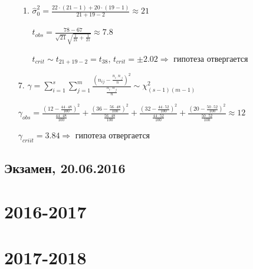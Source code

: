\documentclass[12pt, a4paper]{article}\usepackage[]{graphicx}\usepackage[]{color}
\begin{document}
\begin{enumerate}
\begin{enumerate}
			\item $\hat{\sigma}_0^2 = \frac{22\cdot (21-1) + 20 \cdot (19-1)}{21 + 19 - 2} \approx 21$

			$t_{obs} = \frac{78-67}{\sqrt{21} \sqrt{\frac{1}{21}+ \frac{1}{21}}} \approx 7.8 $

			$t_{crit}  \sim t_{21+19-2} = t_{38}$, $t_{crit} = \pm 2.02 \Rightarrow$ гипотеза отвергается
		\end{enumerate}

	\item[7.] $\gamma = \sum_{i=1}^s \sum_{j=1}^m \frac{\left(n_{ij} - \frac{n_{i\cdot}n_{\cdot j}}{n}\right)^2}{\frac{n_{i\cdot}n_{\cdot j}}{n}} \sim \chi^2_{(s-1)(m-1)}$

	$\gamma_{obs} = \frac{\left(12-\frac{44\cdot48}{100}\right)^2}{\frac{44\cdot48}{100}} + \frac{\left(36-\frac{56\cdot48}{100}\right)^2}{\frac{56\cdot48}{100}} + \frac{\left(32-\frac{44\cdot52}{100}\right)^2}{\frac{44\cdot52}{100}} + \frac{\left(20-\frac{50\cdot52}{100}\right)^2}{\frac{50\cdot52}{100}} \approx 12$

	$\gamma_{criit} = 3.84 \Rightarrow$  гипотеза отвергается

\end{enumerate}


\subsection{Экзамен, 20.06.2016}




\section{2016-2017}



\section{2017-2018}


\end{document}
